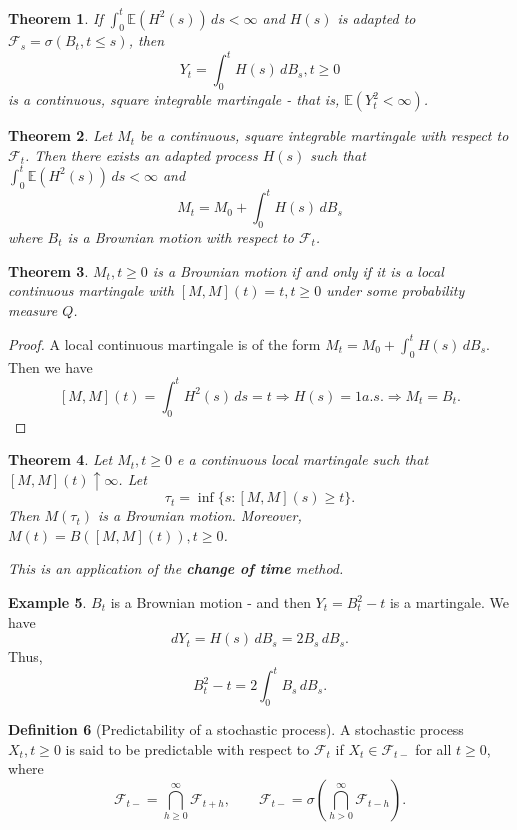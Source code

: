 \documentclass[10pt, oneside, reqno]{amsart}
\theoremstyle{plain}%
\newtheorem{thm}{Theorem}[section]
\theoremstyle{definition}
\newtheorem{defn}[thm]{Definition}
\newtheorem{exmp}[thm]{Example}
\theoremstyle{remark}
\newcommand{\E}{\mathbb{E}}
\newcommand{\sigf}{\mathcal{F}}
\begin{document}
\begin{thm}
	If $\int_0^t \E(H^2(s)) \, ds < \infty$ and $H(s)$ is adapted to $\sigf_s = \sigma( B_t, t \leq s)$, then \[ Y_t = \int_0^t H(s) \, dB_s, t \geq 0
	\]  is a continuous, square integrable martingale - that is, $\E(Y_t^2 < \infty)$.
\end{thm}

\begin{thm}
	Let $M_t$ be a continuous, square integrable martingale with respect to $\sigf_t$.  Then there exists an adapted process $H(s)$ such that $\int_0^t \E(H^2(s)) \, ds < \infty$ and \[
		M_t = M_0 + \int_0^t H(s) \, dB_s
	\] where $B_t$ is a Brownian motion with respect to $\sigf_t$.
\end{thm}

\begin{thm}
	$M_t, t \geq 0$ is a Brownian motion if and only if it is a local continuous martingale with $[M, M](t) = t, t \geq 0$ under some probability measure $Q$.
\end{thm}
\begin{proof}
	A local continuous martingale is of the form $M_t = M_0 + \int_0^t H(s) \, dB_s$.  Then we have \[
		[M, M](t) = \int_0^t H^2(s) \, ds = t \Rightarrow H(s) = 1 a.s. \Rightarrow M_t = B_t.
	\]
\end{proof}

\begin{thm}
	Let $M_t, t \geq 0$ e a continuous local martingale such that $[M, M](t) \uparrow \infty$.  Let \[
		\tau_t = \inf \{ s : [M, M](s) \geq t \}.
	\] Then $M(\tau_t)$ is a Brownian motion.  Moreover, $M(t) = B([M, M](t)), t \geq 0$. 
	
	This is an application of the \textbf{change of time} method.
\end{thm}

\begin{exmp}
	$B_t$ is a Brownian motion - and then $Y_t = B_t^2 - t$ is a martingale.  We have \[
		dY_t = H(s) \, dB_s = 2 B_s \, dB_s.  
	\]  Thus, \[
		B_t^2 - t = 2 \int_0^t B_s \, dB_s.
	\]
\end{exmp}

\begin{defn}[Predictability of a stochastic process]
	A stochastic process $X_t, t \geq 0$ is said to be predictable with respect to $\sigf_t$ if $X_t \in \sigf_{t-}$ for all $t \geq 0$, where \[
		\sigf_{t-} = \bigcap_{h \geq 0}^\infty \sigf_{t + h}, \qquad \sigf_{t-} = \sigma \left( \bigcap_{h > 0}^\infty \sigf_{t - h} \right).
	\] 
\end{defn}
\end{document}

